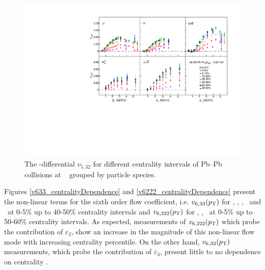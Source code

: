 \begin{figure}[!htb]
\begin{center}
\includegraphics[scale=0.82]{figures/results/All_v523_gap00_CentDep_PID2.pdf}
\end{center}
\caption{The \pT-differential $v_{5,32}$ for different centrality intervals of Pb--Pb collisions at \sNN~ grouped by particle species.}
\label{v523_centralityDependence}
\end{figure}

Figures \ref{v633_centralityDependence} and \ref{v6222_centralityDependence} present the non-linear terms for the sixth order flow coefficient, i.e. $v_{6,33}(p_{\rm{T}})$ for \pion, \kaon, \Ks, \proton~and \lambdas~at 0-5\% up to 40-50\% centrality intervals and $v_{6,222}(p_{\rm{T}})$ for \pion, \kaon, \proton~at 0-5\% up to 50-60\% centrality intervals. As expected, measurements of $v_{6,222}(p_{\rm{T}})$ which probe the contribution of $\varepsilon_2$, show an increase in the magnitude of this non-linear flow mode with increasing centrality percentile. On the other hand, $v_{6,33}(p_{\rm{T}})$ measurements, which probe the contribution of $\varepsilon_3$, present little to no dependence on centrality \cite{Acharya:2017zfg}. 


